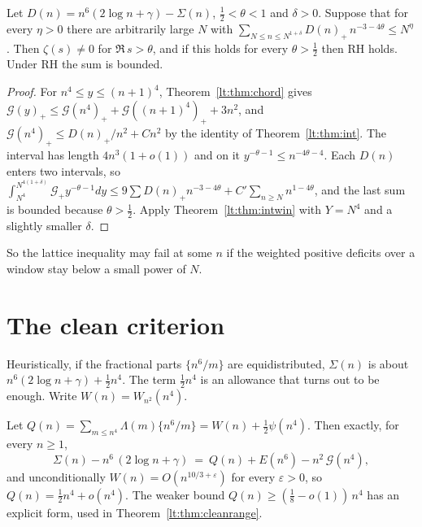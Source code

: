 \begin{theorem}\label{lt:thm:mean}
Let $D(n)=n^6(2\log n+\gamma)-\Sigma(n)$, $\tfrac12<\theta<1$ and $\delta>0$. Suppose that for every $\eta>0$ there are arbitrarily large $N$ with $\sum_{N\le n\le N^{1+\delta}}D(n)_+\,n^{-3-4\theta}\le N^\eta$. Then $\zeta(s)\ne0$ for $\Re\,s>\theta$, and if this holds for every $\theta>\tfrac12$ then RH holds. Under RH the sum is bounded.
\end{theorem}

\begin{proof}
For $n^4\le y\le(n+1)^4$, Theorem~\ref{lt:thm:chord} gives $\mathcal G(y)_+\le\mathcal G(n^4)_++\mathcal G((n+1)^4)_++3n^2$, and $\mathcal G(n^4)_+\le D(n)_+/n^2+Cn^2$ by the identity of Theorem~\ref{lt:thm:int}. The interval has length $4n^3(1+o(1))$ and on it $y^{-\theta-1}\le n^{-4\theta-4}$. Each $D(n)$ enters two intervals, so $\int_{N^4}^{N^{4(1+\delta)}}\mathcal G_+y^{-\theta-1}dy\le9\sum D(n)_+n^{-3-4\theta}+C'\sum_{n\ge N}n^{1-4\theta}$, and the last sum is bounded because $\theta>\tfrac12$. Apply Theorem~\ref{lt:thm:intwin} with $Y=N^4$ and a slightly smaller $\delta$.
\end{proof}

So the lattice inequality may fail at some $n$ if the weighted positive deficits over a window stay below a small power of $N$.

\section{The clean criterion}\label{lt:sec:clean}
Heuristically, if the fractional parts $\{n^6/m\}$ are equidistributed, $\Sigma(n)$ is about $n^6(2\log n+\gamma)+\tfrac12n^4$. The term $\tfrac12n^4$ is an allowance that turns out to be enough. Write $W(n)=W_{n^2}(n^4)$.

\begin{proposition}\label{lt:prop:deficit}
Let $Q(n)=\sum_{m\le n^4}\Lambda(m)\{n^6/m\}=W(n)+\tfrac12\psi(n^4)$. Then exactly, for every $n\ge1$,
\[
\Sigma(n)-n^6\,(2\log n+\gamma)\ =\ Q(n)+E(n^6)-n^2\,\mathcal G(n^4),
\]
and unconditionally $W(n)=O(n^{10/3+\varepsilon})$ for every $\varepsilon>0$, so $Q(n)=\tfrac12n^4+o(n^4)$. The weaker bound $Q(n)\ge(\tfrac18-o(1))\,n^4$ has an explicit form, used in Theorem~\ref{lt:thm:cleanrange}.
\end{proposition}

